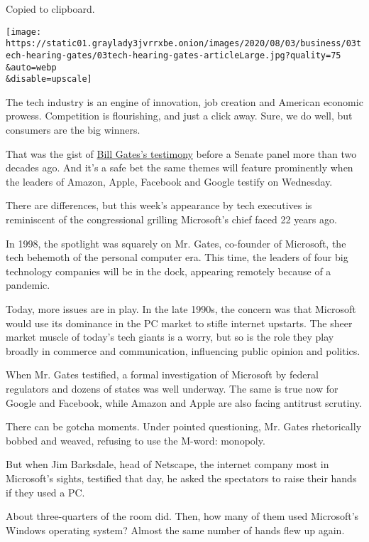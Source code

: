 Copied to clipboard.

\texttt{[image: https://static01.graylady3jvrrxbe.onion/images/2020/08/03/business/03tech-hearing-gates/03tech-hearing-gates-articleLarge.jpg?quality=75\\\&auto=webp\\\&disable=upscale]}

The tech industry is an engine of innovation, job creation and American
economic prowess. Competition is flourishing, and just a click away.
Sure, we do well, but consumers are the big winners.

That was the gist of
\href{https://archive.nytimes3xbfgragh.onion/www.nytimes3xbfgragh.onion/library/tech/98/03/biztech/articles/04microsoft.html}{Bill
Gates's testimony} before a Senate panel more than two decades ago. And
it's a safe bet the same themes will feature prominently when the
leaders of Amazon, Apple, Facebook and Google testify on Wednesday.

There are differences, but this week's appearance by tech executives is
reminiscent of the congressional grilling Microsoft's chief faced 22
years ago.

In 1998, the spotlight was squarely on Mr. Gates, co-founder of
Microsoft, the tech behemoth of the personal computer era. This time,
the leaders of four big technology companies will be in the dock,
appearing remotely because of a pandemic.

Today, more issues are in play. In the late 1990s, the concern was that
Microsoft would use its dominance in the PC market to stifle internet
upstarts. The sheer market muscle of today's tech giants is a worry, but
so is the role they play broadly in commerce and communication,
influencing public opinion and politics.

When Mr. Gates testified, a formal investigation of Microsoft by federal
regulators and dozens of states was well underway. The same is true now
for Google and Facebook, while Amazon and Apple are also facing
antitrust scrutiny.

There can be gotcha moments. Under pointed questioning, Mr. Gates
rhetorically bobbed and weaved, refusing to use the M-word: monopoly.

But when Jim Barksdale, head of Netscape, the internet company most in
Microsoft's sights, testified that day, he asked the spectators to raise
their hands if they used a PC.

About three-quarters of the room did. Then, how many of them used
Microsoft's Windows operating system? Almost the same number of hands
flew up again.

